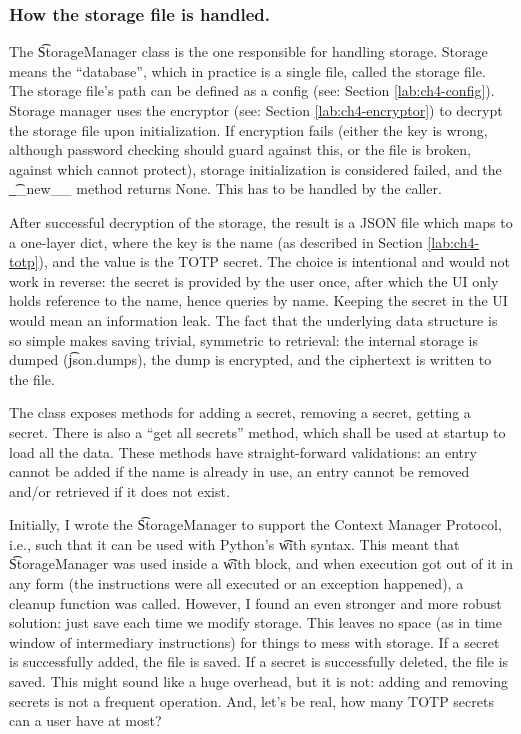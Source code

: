 \subsubsection{How the storage file is handled.}

The \t{StorageManager} class is the one responsible for handling storage.
Storage means the ``database'', which in practice is a single file, called the storage file.
The storage file's path can be defined as a config (see: Section \ref{lab:ch4-config}).
Storage manager uses the encryptor (see: Section \ref{lab:ch4-encryptor}) to decrypt the storage file upon initialization.
If encryption fails (either the key is wrong, although password checking should guard against this, or the file is broken, against which \app{} cannot protect), storage initialization is considered failed, and the \t{\_\_new\_\_} method returns None.
This has to be handled by the caller.

After successful decryption of the storage, the result is a JSON file which maps to a one-layer dict, where the key is the name (as described in Section \ref{lab:ch4-totp}), and the value is the TOTP secret.
The choice is intentional and would not work in reverse: the secret is provided by the user once, after which the UI only holds reference to the name, hence queries by name.
Keeping the secret in the UI would mean an information leak.
The fact that the underlying data structure is so simple makes saving trivial, symmetric to retrieval: the internal storage is dumped (\t{json.dumps}), the dump is encrypted, and the ciphertext is written to the file.

The class exposes methods for adding a secret, removing a secret, getting a secret.
There is also a ``get all secrets'' method, which shall be used at startup to load all the data.
These methods have straight-forward validations: an entry cannot be added if the name is already in use, an entry cannot be removed and/or retrieved if it does not exist.

Initially, I wrote the \t{StorageManager} to support the Context Manager Protocol, i.e., such that it can be used with Python's \t{with} syntax.
This meant that \t{StorageManager} was used inside a \t{with} block, and when execution got out of it in any form (the instructions were all executed or an exception happened), a cleanup function was called.
However, I found an even stronger and more robust solution: just save each time we modify storage.
This leaves no space (as in time window of intermediary instructions) for things to mess with storage.
If a secret is successfully added, the file is saved.
If a secret is successfully deleted, the file is saved.
This might sound like a huge overhead, but it is not: adding and removing secrets is not a frequent operation.
And, let's be real, how many TOTP secrets can a user have at most?





